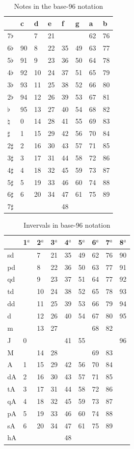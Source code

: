 \documentclass{article}
\begin{document}
\begin{table}
  \centering
  \begin{tabular}{l|lllllll}
               & c & d& e& f& g& a& b \\
    \hline
    7$\flat$   &   & 7&21&  &  &62&76 \\
    6$\flat$   & 90& 8&22&35&49&63&77 \\
    5$\flat$   & 91& 9&23&36&50&64&78 \\
    4$\flat$   & 92&10&24&37&51&65&79 \\
    3$\flat$   & 93&11&25&38&52&66&80 \\
    2$\flat$   & 94&12&26&39&53&67&81 \\
    $\flat$    & 95&13&27&40&54&68&82 \\
    $\natural$ &  0&14&28&41&55&69&83 \\
    $\sharp$   &  1&15&29&42&56&70&84 \\
    2$\sharp$  &  2&16&30&43&57&71&85 \\
    3$\sharp$  &  3&17&31&44&58&72&86 \\
    4$\sharp$  &  4&18&32&45&59&73&87 \\
    5$\sharp$  &  5&19&33&46&60&74&88 \\
    6$\sharp$  &  6&20&34&47&61&75&89 \\
    7$\sharp$  &   &  &  &48&  &  &   \\
  \end{tabular}
  \caption{Notes in the base-96 notation}
  \label{tab:jama-notas}
\end{table}

\begin{table}
  \centering
  \begin{tabular}{l|llllllll}
    & 1$^{a}$& 2$^{a}$& 3$^{a}$& 4$^{a}$& 5$^{a}$& 6$^{a}$& 7$^{a}$& 8$^{a}$ \\
    \hline
    sd  &  & 7&21&35&49&62&76&90 \\
    pd  &  & 8&22&36&50&63&77&91 \\
    qd  &  & 9&23&37&51&64&77&92 \\
    td  &  &10&24&38&52&65&78&93 \\
    dd  &  &11&25&39&53&66&79&94 \\
    d   &  &12&26&40&54&67&80&95 \\
    m   &  &13&27&  &  &68&82&   \\
    J   & 0&  &  &41&55&  &  &96 \\
    M   &  &14&28&  &  &69&83&   \\
    A   & 1&15&29&42&56&70&84&   \\
    dA  & 2&16&30&43&57&71&85&   \\
    tA  & 3&17&31&44&58&72&86&   \\
    qA  & 4&18&32&45&59&73&87&   \\
    pA  & 5&19&33&46&60&74&88&   \\
    sA  & 6&20&34&47&61&75&89&   \\
    hA  &  &  &  &48&  &  &  &   
  \end{tabular}
  \caption{Invervals in base-96 notation}
  \label{tab:jama-intervalos}
\end{table}
\end{document}
